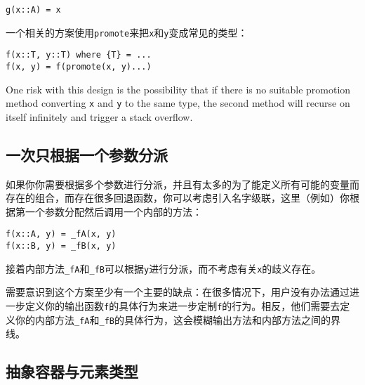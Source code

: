 \begin{verbatim}
g(x::A) = x
\end{verbatim}



一个相关的方案使用\texttt{promote}来把\texttt{x}和\texttt{y}变成常见的类型：




\begin{verbatim}
f(x::T, y::T) where {T} = ...
f(x, y) = f(promote(x, y)...)
\end{verbatim}



One risk with this design is the possibility that if there is no suitable promotion method converting \texttt{x} and \texttt{y} to the same type, the second method will recurse on itself infinitely and trigger a stack overflow.



\hypertarget{2211158616759162982}{}


\subsection{一次只根据一个参数分派}



如果你你需要根据多个参数进行分派，并且有太多的为了能定义所有可能的变量而存在的组合，而存在很多回退函数，你可以考虑引入{\textquotedbl}名字级联{\textquotedbl}，这里（例如）你根据第一个参数分配然后调用一个内部的方法：




\begin{verbatim}
f(x::A, y) = _fA(x, y)
f(x::B, y) = _fB(x, y)
\end{verbatim}



接着内部方法\texttt{\_fA}和\texttt{\_fB}可以根据\texttt{y}进行分派，而不考虑有关\texttt{x}的歧义存在。



需要意识到这个方案至少有一个主要的缺点：在很多情况下，用户没有办法通过进一步定义你的输出函数\texttt{f}的具体行为来进一步定制\texttt{f}的行为。相反，他们需要去定义你的内部方法\texttt{\_fA}和\texttt{\_fB}的具体行为，这会模糊输出方法和内部方法之间的界线。



\hypertarget{7624993517486343641}{}


\subsection{抽象容器与元素类型}



